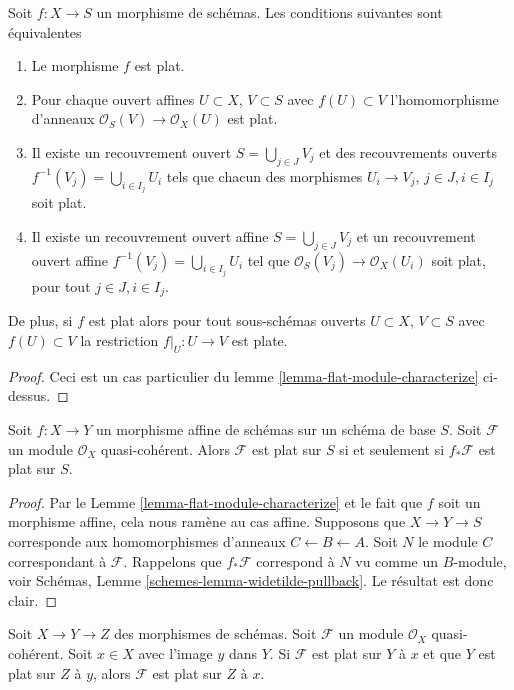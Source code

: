 \begin{lemma}
\label{lemma-flat-characterize}
Soit $f : X \to S$ un morphisme de schémas. Les conditions
suivantes sont équivalentes
\begin{enumerate}
\item Le morphisme $f$ est plat.
\item Pour chaque ouvert affines $U \subset X$, $V \subset S$
avec $f(U) \subset V$ l'homomorphisme
d'anneaux $\mathcal{O}_S(V) \to \mathcal{O}_X(U)$ est plat.
\item Il existe un recouvrement ouvert $S = \bigcup_{j \in J} V_j$ et
des recouvrements ouverts $f^{-1}(V_j) = \bigcup_{i \in I_j} U_i$ tels que chacun
des morphismes $U_i \to V_j$, $j\in J, i\in I_j$ soit
plat.
\item Il existe un recouvrement ouvert affine $S = \bigcup_{j \in J} V_j$
et un recouvrement ouvert affine $f^{-1}(V_j) = \bigcup_{i \in I_j} U_i$
tel que $\mathcal{O}_S(V_j) \to \mathcal{O}_X(U_i)$ soit plat, pour tout
$j\in J, i\in I_j$.
\end{enumerate}
De plus, si $f$ est plat alors
pour tout sous-schémas ouverts $U \subset X$, $V \subset S$ avec $f(U) \subset V$
la restriction $f|_U : U \to V$ est plate.
\end{lemma}

\begin{proof}
Ceci est un cas particulier du lemme \ref{lemma-flat-module-characterize}
ci-dessus.
\end{proof}

\begin{lemma}
\label{lemma-pushforward-flat-affine}
Soit $f : X \to Y$ un morphisme affine de schémas sur un schéma de base $S$.
Soit $\mathcal{F}$ un module $\mathcal{O}_X$ quasi-cohérent. Alors $\mathcal{F}$
est plat sur $S$ si et seulement si $f_*\mathcal{F}$
est plat sur $S$.
\end{lemma}

\begin{proof}
Par le Lemme \ref{lemma-flat-module-characterize} et le fait que $f$ soit un morphisme
affine, cela nous ramène au cas affine. Supposons que $X \to Y \to S$
corresponde aux homomorphismes d'anneaux $C \leftarrow B \leftarrow A$. Soit $N$
le module $C$ correspondant à $\mathcal{F}$.
Rappelons que $f_*\mathcal{F}$ correspond à $N$ vu comme un $B$-module,
voir Schémas, Lemme \ref{schemes-lemma-widetilde-pullback}. Le résultat
est donc clair.
\end{proof}

\begin{lemma}
\label{lemma-composition-module-flat}
Soit $X \to Y \to Z$ des morphismes de schémas. Soit $\mathcal{F}$ un module $\mathcal{O}_X$ quasi-cohérent.
Soit $x \in X$ avec l'image $y$ dans $Y$. Si $\mathcal{F}$ est plat
sur $Y$ à $x$ et que $Y$ est plat sur $Z$ à $y$,
alors $\mathcal{F}$ est plat sur $Z$ à $x$.
\end{lemma}


